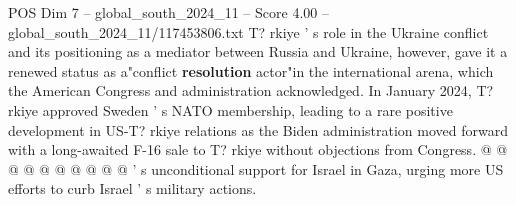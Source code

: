 \begin{textsample}{POS Dim 7 – global\_south\_2024\_11 – Score 4.00 – global\_south\_2024\_11/117453806.txt}
T? rkiye ' s role in the Ukraine conflict and its positioning as a mediator between Russia and Ukraine, however, gave it a renewed status as a"conflict \textbf{resolution} actor"in the international arena, which the American Congress and administration acknowledged.
In January 2024, T? rkiye approved Sweden ' s NATO membership, leading to a rare positive development in US-T? rkiye relations as the Biden administration moved forward with a long-awaited F-16 sale to T? rkiye without objections from Congress. @ @ @ @ @ @ @ @ @ @ ' s unconditional support for Israel in Gaza, urging more US efforts to curb Israel ' s military actions.

\end{textsample}
